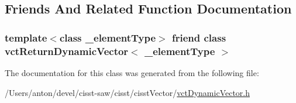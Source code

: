 \subsection{Friends And Related Function Documentation}
\hypertarget{classvct_dynamic_vector_adf7a81f9466b24ae64c58cb6be285250}{}
\subsubsection[{vct\+Return\+Dynamic\+Vector$<$ \+\_\+element\+Type $>$}]{\setlength{\rightskip}{0pt plus 5cm}template$<$class \+\_\+element\+Type$>$ friend class {\bf vct\+Return\+Dynamic\+Vector}$<$ \+\_\+element\+Type $>$\hspace{0.3cm}{\ttfamily [friend]}}\label{classvct_dynamic_vector_adf7a81f9466b24ae64c58cb6be285250}


The documentation for this class was generated from the following file\+:\begin{DoxyCompactItemize}
\item 
/\+Users/anton/devel/cisst-\/saw/cisst/cisst\+Vector/\hyperlink{vct_dynamic_vector_8h}{vct\+Dynamic\+Vector.\+h}\end{DoxyCompactItemize}
